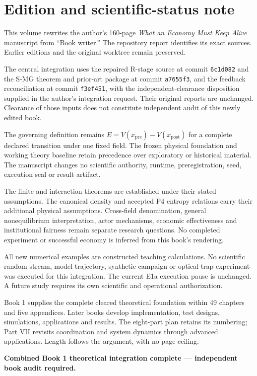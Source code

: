 \chapter*{Edition and scientific-status note}

This volume rewrites the author's 160-page \emph{What an Economy Must Keep Alive} manuscript from ``Book writer.'' The repository report identifies its exact sources. Earlier editions and the original worktree remain preserved.

The central integration uses the repaired R-stage source at commit \texttt{6c1d082} and the S-MG theorem and prior-art package at commit \texttt{a7655f3}, and the feedback reconciliation at commit \texttt{f3ef451}, with the independent-clearance disposition supplied in the author's integration request. Their original reports are unchanged. Clearance of those inputs does not constitute independent audit of this newly edited book.

The governing definition remains $E=V(x_{\mathrm{pre}})-V(x_{\mathrm{post}})$ for a complete declared transition under one fixed field. The frozen physical foundation and working theory baseline retain precedence over exploratory or historical material. The manuscript changes no scientific authority, runtime, preregistration, seed, execution seal or result artifact.

The finite and interaction theorems are established under their stated assumptions. The canonical density and accepted P4 entropy relations carry their additional physical assumptions. Cross-field denomination, general nonequilibrium interpretation, actor mechanisms, economic effectiveness and institutional fairness remain separate research questions. No completed experiment or successful economy is inferred from this book's rendering.

All new numerical examples are constructed teaching calculations. No scientific random stream, model trajectory, synthetic campaign or optical-trap experiment was executed for this integration. The current E1a execution pause is unchanged. A future study requires its own scientific and operational authorization.

Book 1 supplies the complete cleared theoretical foundation within 49 chapters and five appendices. Later books develop implementation, test designs, simulations, applications and results. The eight-part plan retains its numbering; Part VII revisits coordination and system dynamics through advanced applications. Length follows the argument, with no page ceiling.

\textbf{Combined Book 1 theoretical integration complete --- independent book audit required.}
